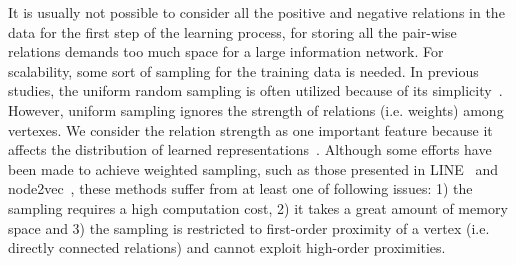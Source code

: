 It is usually not possible to consider all the positive and negative relations in the data for the first step of the learning process, for storing all the pair-wise relations demands too much space for a large information network. For scalability, some sort of sampling for the training data is needed.  In previous studies, the uniform random sampling is often utilized because of its simplicity~\cite{dw,wl,hpe,com}.  However, uniform sampling ignores the strength of relations (i.e. weights) among vertexes.  We consider the relation strength as one important feature because it affects the distribution of learned representations~\cite{dwmf}. Although some efforts have been made to achieve weighted sampling, such as those presented in LINE~\cite{line} and node2vec~\cite{n2v}, these methods suffer from at least one of following issues: 1) the sampling requires a high computation cost, 2) it takes a great amount of memory space and 3) the sampling is restricted to first-order proximity of a vertex (i.e. directly connected relations) and cannot exploit high-order proximities.






